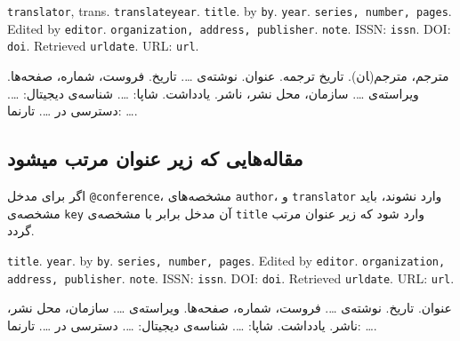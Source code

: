 \documentclass[a4paper,11pt]{article}
\begin{document}
\begin{itemize}[nosep]
\begin{latin}
\item[] []
{\tt translator}, trans. {\tt translateyear}. {\tt title}. by {\tt by}. {\tt year}. {\tt series, number, pages}. Edited by {\tt editor}. {\tt organization, address, publisher}. {\tt note}. ISSN: {\tt issn}. DOI: {\tt doi}. Retrieved {\tt urldate}. URL: {\tt url}. 
\end{latin}

\item[] []
{\persianttfamily مترجم}، مترجم(‍ان). {\persianttfamily  تاریخ ترجمه}. {\persianttfamily عنوان}. نوشته‌ی {\persianttfamily …}. {\persianttfamily تاریخ}.  {\persianttfamily فروست، شماره، صفحه‌ها}. ویراسته‌ی {\persianttfamily …}. {\persianttfamily سازمان، محل نشر، ناشر}. {\persianttfamily یادداشت}. شاپا: {\persianttfamily …}. شناسه‌ی دیجیتال: {\persianttfamily …}. دسترسی در {\persianttfamily …}. تارنما: {\persianttfamily …}. 
\end{itemize}





\subsection{مقاله‌هایی که زیر عنوان مرتب میشود}
اگر برای مدخل \verb|@conference|، مشخصه‌های \verb|author|، و \verb|translator| وارد نشوند، باید مشخصه‌ی \verb|key| آن مدخل برابر با مشخصه‌ی \verb|title| وارد شود که زیر عنوان مرتب گردد.

\begin{itemize}[nosep]
\begin{latin}
\item[] []
{\tt title}. {\tt year}. by {\tt by}. {\tt series, number, pages}. Edited by {\tt editor}. {\tt organization, address, publisher}. {\tt note}. ISSN: {\tt issn}. DOI: {\tt doi}. Retrieved {\tt urldate}. URL: {\tt url}. 
\end{latin}

\item[] []
{\persianttfamily عنوان}. {\persianttfamily تاریخ}. نوشته‌ی {\persianttfamily …}. {\persianttfamily فروست، شماره، صفحه‌ها}. ویراسته‌ی {\persianttfamily …}. {\persianttfamily سازمان، محل نشر، ناشر}. {\persianttfamily یادداشت}. شاپا: {\persianttfamily …}. شناسه‌ی دیجیتال: {\persianttfamily …}. دسترسی در {\persianttfamily …}. تارنما: {\persianttfamily …}. 
\end{itemize}
\end{document}

